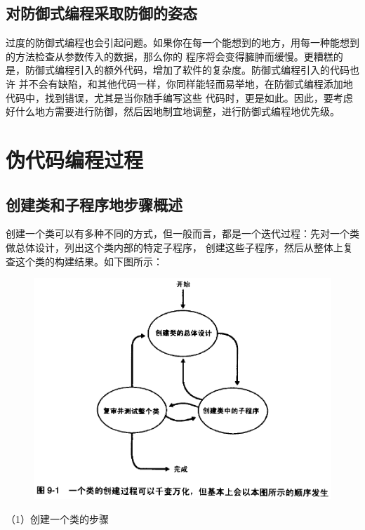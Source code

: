 \documentclass{article}
\begin{document}
\subsection{对防御式编程采取防御的姿态}
过度的防御式编程也会引起问题。如果你在每一个能想到的地方，用每一种能想到的方法检查从参数传入的数据，那么你的
程序将会变得臃肿而缓慢。更糟糕的是，防御式编程引入的额外代码，增加了软件的复杂度。防御式编程引入的代码也许
并不会有缺陷，和其他代码一样，你同样能轻而易举地，在防御式编程添加地代码中，找到错误，尤其是当你随手编写这些
代码时，更是如此。因此，要考虑好什么地方需要进行防御，然后因地制宜地调整，进行防御式编程地优先级。


\section{伪代码编程过程}
\subsection{创建类和子程序地步骤概述}
创建一个类可以有多种不同的方式，但一般而言，都是一个迭代过程：先对一个类做总体设计，列出这个类内部的特定子程序，
创建这些子程序，然后从整体上复查这个类的构建结果。如下图所示：
\begin{figure}[htb]
    \centering
    \includegraphics[width=15cm]{figure12.png}
\end{figure}
\par
（1）创建一个类的步骤
\par
\end{document}
